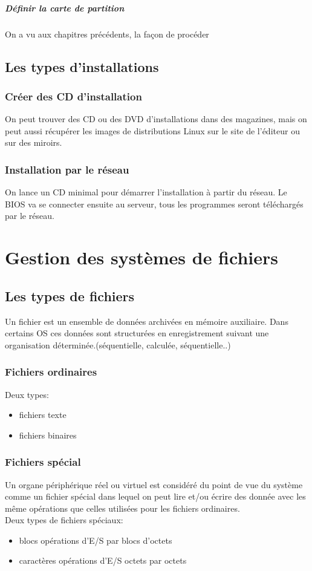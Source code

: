 \documentclass[12pt,a4paper,openany]{book}
\begin{document}
		 \paragraph{Définir la carte de partition}
			On a vu aux chapitres précédents, la façon de procéder	
	\section{Les types d'installations}
		\subsection{Créer des CD d'installation}
		On peut trouver des CD ou des DVD d'installations dans des magazines, 
		mais on peut aussi récupérer les images de distributions Linux sur 
		le site de l'éditeur ou sur des miroirs.

		\subsection{Installation par le réseau}
		On lance un CD minimal pour démarrer l'installation à partir du réseau.
		Le BIOS va se connecter ensuite au serveur, tous les programmes seront 
		téléchargés par le réseau.

	\chapter{Gestion des systèmes de fichiers}
	\section{Les types de fichiers}
	Un fichier est un ensemble de données archivées en mémoire auxiliaire. Dans certains
	OS ces données sont structurées en enregistrement suivant une organisation 
	déterminée.(séquentielle, calculée, séquentielle..)\\
		\subsection{Fichiers ordinaires}
		Deux types:
		\begin{itemize}
			\item fichiers texte
			\item fichiers binaires
		\end{itemize}
		\subsection{Fichiers spécial}
		Un organe périphérique réel ou virtuel est considéré du point de vue du 
		système comme un fichier spécial dans lequel on peut lire et/ou écrire
		des donnée avec les même opérations que celles utilisées pour les fichiers
		ordinaires.\\
		Deux types de fichiers spéciaux: 
		\begin{itemize}
			\item blocs opérations d'E/S par blocs d'octets
			\item caractères opérations d'E/S octets par octets
		\end{itemize}
\end{document}
